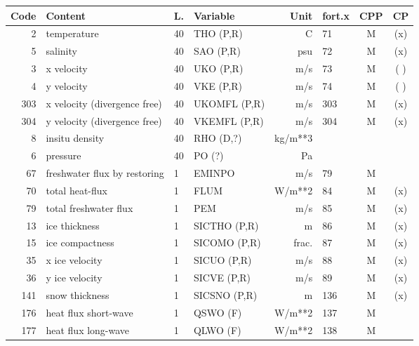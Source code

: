 \begin{table}
\begin{footnotesize}

\begin{tabular}{r|l|l|l|r|l|c|c}

Code & Content  		       & L.    &  Variable	&   Unit    &	 fort.x &  CPP  &    CP    \\ \hline
  2  & temperature		       & 40    &  THO (P,R)	&   C	    &	 71	&  M	&    (x)   \\
  5  & salinity 		       & 40    &  SAO (P,R)	&   psu     &	 72	&  M	&    (x)   \\
  3  & x velocity		       & 40    &  UKO (P,R)	&   m/s     &	 73	&  M	&    ( )   \\
  4  & y velocity		       & 40    &  VKE (P,R)	&   m/s     &	 74	&  M	&    ( )   \\
303  & x velocity (divergence free)    & 40    &  UKOMFL (P,R)  &   m/s     &	303	&  M	&    (x)   \\
304  & y velocity (divergence free)    & 40    &  VKEMFL (P,R)  &   m/s     &	304	&  M	&    (x)   \\
  8  & insitu density		       & 40    &  RHO  (D,?)	&   kg/m**3 &		&	&	   \\
  6  & pressure 		       & 40    &  PO   (?)	&   Pa      &		&	&	   \\
 67  & freshwater flux by restoring     &  1    &  EMINPO	&   m/s     &	 79	&  M	&	   \\
 70  & total heat-flux		       &  1    &  FLUM  	&   W/m**2  &	 84	&  M	&    (x)   \\
 79  & total freshwater flux	       &  1    &  PEM		&   m/s     &	 85	&  M	&    (x)   \\
 13  & ice thickness		       &  1    &  SICTHO (P,R)  &   m	    &	 86	&  M	&    (x)   \\
 15  & ice compactness  	       &  1    &  SICOMO (P,R)  &   frac.   &	 87	&  M	&    (x)   \\
 35  & x ice velocity		       &  1    &  SICUO  (P,R)  &   m/s     &	 88	&  M	&    (x)   \\
 36  & y ice velocity		       &  1    &  SICVE  (P,R)  &   m/s     &	 89	&  M	&    (x)   \\
141  & snow thickness		       &  1    &  SICSNO (P,R)  &   m	    &	136	&  M	&    (x)   \\
176  & heat flux short-wave	       &  1    &  QSWO   (F)	&   W/m**2  &	137	&  M	&	   \\
177  & heat flux long-wave	       &  1    &  QLWO   (F)	&   W/m**2  &	138	&  M	&	   \\

\end{tabular}
\end{footnotesize}
\end{table}

